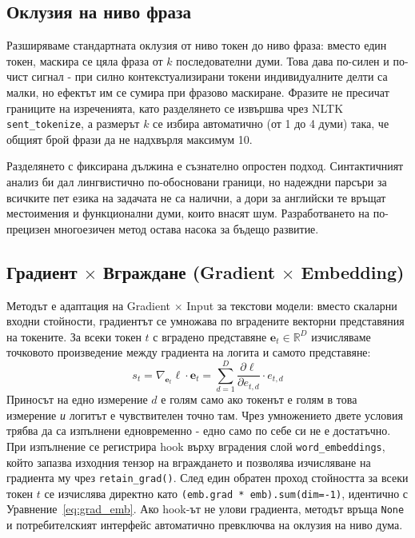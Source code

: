 \documentclass[12pt,a4paper]{report}
\begin{document}
\subsection{Оклузия на ниво фраза}
\label{sec:occlusion_phrase}

Разширяваме стандартната оклузия от ниво токен до ниво фраза: вместо един токен, маскира се цяла фраза от $k$ последователни думи. Това дава по-силен и по-чист сигнал - при силно контекстуализирани токени индивидуалните делти са малки, но ефектът им се сумира при фразово маскиране. Фразите не пресичат границите на изреченията, като разделянето се извършва чрез NLTK \texttt{sent\_tokenize}, а размерът $k$ се избира автоматично (от 1 до 4 думи) така, че общият брой фрази да не надхвърля максимум 10.

Разделянето с фиксирана дължина е съзнателно опростен подход. Синтактичният анализ би дал лингвистично по-обосновани граници, но надеждни парсъри за всичките пет езика на задачата не са налични, а дори за английски те връщат местоимения и функционални думи, които внасят шум. Разработването на по-прецизен многоезичен метод остава насока за бъдещо развитие.


\subsection{Градиент $\times$ Вграждане (Gradient $\times$ Embedding)}
\label{sec:gradient_embedding}

Методът е адаптация на Gradient $\times$ Input \cite{simonyan2014gradient} за текстови модели: вместо скаларни входни стойности, градиентът се умножава по вградените векторни представяния на токените. За всеки токен $t$ с вградено представяне $\mathbf{e}_t \in \mathbb{R}^{D}$ изчисляваме точковото произведение между градиента на логита и самото представяне:
\begin{equation}
  s_t = \nabla_{\mathbf{e}_t} \ell \cdot \mathbf{e}_t = \sum_{d=1}^{D} \frac{\partial \ell}{\partial e_{t,d}} \cdot e_{t,d}
  \label{eq:grad_emb}
\end{equation}
Приносът на едно измерение $d$ е голям само ако токенът е голям в това измерение \textit{и} логитът е чувствителен точно там. Чрез умножението двете условия трябва да са изпълнени едновременно - едно само по себе си не е достатъчно. При изпълнение се регистрира hook върху вградения слой \texttt{word\_embeddings}, който запазва изходния тензор на вграждането и позволява изчисляване на градиента му чрез \texttt{retain\_grad()}. След един обратен проход стойността за всеки токен $t$ се изчислява директно като \texttt{(emb.grad * emb).sum(dim=-1)}, идентично с Уравнение~\ref{eq:grad_emb}. Ако hook-ът не улови градиента, методът връща \texttt{None} и потребителският интерфейс автоматично превключва на оклузия на ниво дума.
\end{document}
